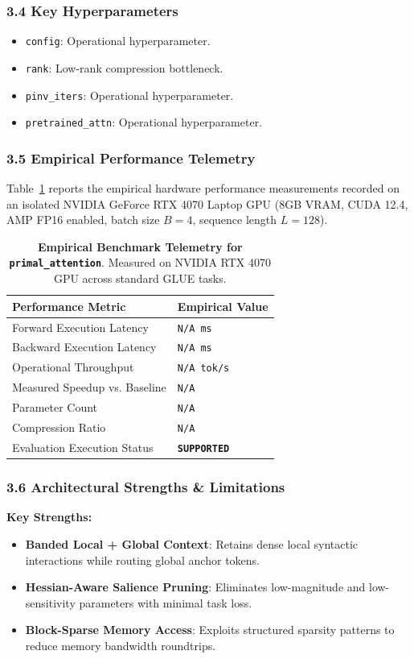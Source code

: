 \subsubsection*{3.4 Key Hyperparameters}
\begin{itemize}
    \item \texttt{config}: Operational hyperparameter.
    \item \texttt{rank}: Low-rank compression bottleneck.
    \item \texttt{pinv\_iters}: Operational hyperparameter.
    \item \texttt{pretrained\_attn}: Operational hyperparameter.
\end{itemize}

\subsubsection*{3.5 Empirical Performance Telemetry}
Table~\ref{tab:telemetry_primal\_attention} reports the empirical hardware performance measurements recorded on an isolated NVIDIA GeForce RTX 4070 Laptop GPU (8GB VRAM, CUDA 12.4, AMP FP16 enabled, batch size $B=4$, sequence length $L=128$).

\begin{table}[h]
\centering
\small
\caption{\textbf{Empirical Benchmark Telemetry for \texttt{primal\_attention}}. Measured on NVIDIA RTX 4070 GPU across standard GLUE tasks.}
\label{tab:telemetry_primal\_attention}
\begin{tabularx}{\columnwidth}{lX}
\toprule
\textbf{Performance Metric} & \textbf{Empirical Value} \\
\midrule
Forward Execution Latency & \texttt{N/A ms} \\
Backward Execution Latency & \texttt{N/A ms} \\
Operational Throughput & \texttt{N/A tok/s} \\
Measured Speedup vs. Baseline & \texttt{N/A} \\
Parameter Count & \texttt{N/A} \\
Compression Ratio & \texttt{N/A} \\
Evaluation Execution Status & \textbf{\texttt{SUPPORTED}} \\
\bottomrule
\end{tabularx}
\end{table}

\subsubsection*{3.6 Architectural Strengths \& Limitations}
\textbf{Key Strengths:}
\begin{itemize}
    \item \textbf{Banded Local + Global Context}: Retains dense local syntactic interactions while routing global anchor tokens.
    \item \textbf{Hessian-Aware Salience Pruning}: Eliminates low-magnitude and low-sensitivity parameters with minimal task loss.
    \item \textbf{Block-Sparse Memory Access}: Exploits structured sparsity patterns to reduce memory bandwidth roundtrips.
\end{itemize}

